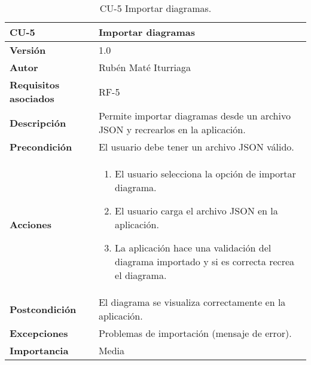 \begin{table}[p]
	\centering
	\begin{tabularx}{\linewidth}{ p{} p{} }
		\toprule
		\textbf{CU-5}    & \textbf{Importar diagramas}\\
		\toprule
		\textbf{Versión}              & 1.0    \\
	\textbf{Autor}                & Rubén Maté Iturriaga \\
		\textbf{Requisitos asociados} & RF-5 \\
		\textbf{Descripción}          & Permite importar diagramas desde un archivo JSON y recrearlos en la aplicación. \\
		\textbf{Precondición}         & El usuario debe tener un archivo JSON válido. \\
		\textbf{Acciones}             &
		\begin{enumerate}
			\def\labelenumi{\arabic{enumi}.}
			\tightlist
			\item El usuario selecciona la opción de importar diagrama.
			\item El usuario carga el archivo JSON en la aplicación.
            \item La aplicación hace una validación del diagrama importado y si es correcta recrea el diagrama.
		\end{enumerate}\\
		\textbf{Postcondición}        & El diagrama se visualiza correctamente en la aplicación. \\
		\textbf{Excepciones}          & Problemas de importación (mensaje de error). \\
		\textbf{Importancia}          & Media \\
		\bottomrule
	\end{tabularx}
	\caption{CU-5 Importar diagramas.}
\end{table}

